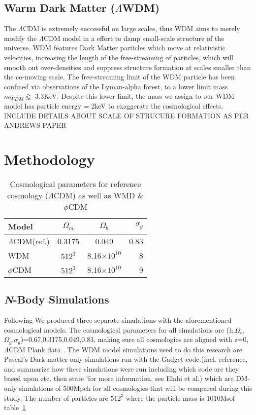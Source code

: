 \documentclass[a4paper,fleqn,usenatbib]{mnras}
\def \qcdm{$\phi$CDM }
\begin{document}
\subsection{Warm Dark Matter  ($\Lambda$WDM)} 
The $\Lambda$CDM is extremely successful on large scales, thus WDM aims to merely modify the $\Lambda$CDM model in a effort to damp small-scale structure of the universe. WDM features Dark Matter particles which move at relativistic velocities, increasing the length of the free-streaming of particles, which will smooth out over-densities and suppress structure formation at scales smaller than the co-moving scale\citep{Bode_01}.
The free-streaming limit of the WDM particle has been confined via observations of the Lyman-alpha forest, to a lower limit mass $m_{WDM}\gtrapprox$ 3.3KeV. \citep{Viel_13} Despite this lower limit, the mass we assign to our WDM model has particle energy = 2keV to exaggerate the cosmological effects. INCLUDE DETAILS ABOUT SCALE OF STRUCURE FORMATION AS PER ANDREWS PAPER  

\section{Methodology}\label{SiriusBlack}\label{method}

\begin{table}
	\centering
	\caption{Cosmological parameters for reference cosmology ($\Lambda$CDM) as well as WMD \& \qcdm}
	\label{tab:1}
	\begin{tabular}{lccr} %
		\hline
		Model & $\Omega_{m}$ & $\Omega_{b}$ & $\sigma_{g}$  \\
		\hline
		$\Lambda$CDM(ref.) & 0.3175 & 0.049 & 0.83\\
		WDM & $512^{3}$ & 8.16$\times$$10^{10}$ & 8 \\
		\qcdm & $512^{3}$ & 8.16$\times$$10^{10}$ & 9 \\
		\hline
	\end{tabular}
\end{table}

\subsection{\textit{N}-Body Simulations}
Following \citep{Elahi_15} We produced three separate simulations with the aforementioned cosmological models. The cosmological parameters for all simulations are (h,$\Omega_{b}$,$\Omega_{g}$,$\sigma_{g}$)=0.67,0.3175,0.049,0.83, making sure all cosmologies are aligned with z=0, $\Lambda$CDM Plank data \citep{Plank_14b,Plank_16}. The WDM model  simulations used to do this research are Pascal’s Dark matter only simulations run with the Gadget code.(incl. reference, and summarize how these simulations were run including which code are they based upon etc. then state ‘for more information, see Elahi et al.) which are DM-only simulations of 500Mpch for all cosmologies that will be compared during this study. The number of particles are $512^{3}$ where the particle mass is 1010Msol table~\ref{tab:1}
\end{document}

